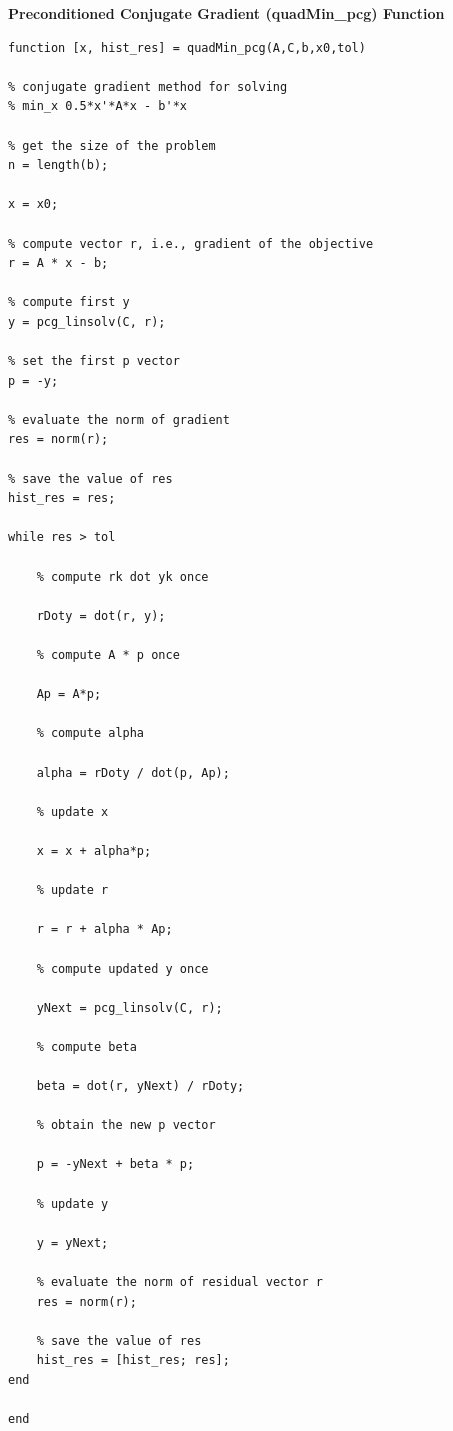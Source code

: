 \documentclass[12pt]{article}
\begin{document}
\vspace{8mm}

\noindent \textbf{Preconditioned Conjugate Gradient (quadMin\_pcg) Function}
\vspace{4mm}
\begin{verbatim}
function [x, hist_res] = quadMin_pcg(A,C,b,x0,tol)

% conjugate gradient method for solving
% min_x 0.5*x'*A*x - b'*x

% get the size of the problem
n = length(b);

x = x0;

% compute vector r, i.e., gradient of the objective
r = A * x - b;

% compute first y
y = pcg_linsolv(C, r);

% set the first p vector 
p = -y;

% evaluate the norm of gradient
res = norm(r);

% save the value of res
hist_res = res;

while res > tol

    % compute rk dot yk once

    rDoty = dot(r, y);

    % compute A * p once

    Ap = A*p;

    % compute alpha
    
    alpha = rDoty / dot(p, Ap);
    
    % update x 
    
    x = x + alpha*p;
    
    % update r
    
    r = r + alpha * Ap;

    % compute updated y once

    yNext = pcg_linsolv(C, r);
    
    % compute beta
    
    beta = dot(r, yNext) / rDoty;
    
    % obtain the new p vector
    
    p = -yNext + beta * p;

    % update y

    y = yNext;
    
    % evaluate the norm of residual vector r
    res = norm(r);
    
    % save the value of res
    hist_res = [hist_res; res];
end

end

\end{verbatim}
\end{document}
